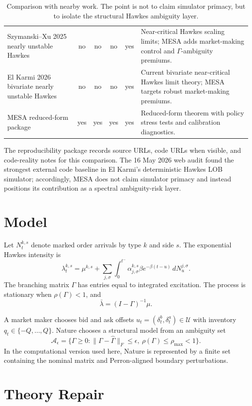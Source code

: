 \documentclass[review]{siamonline250211}
\newcommand{\cA}{\mathcal{A}}
\newcommand{\cU}{\mathcal{U}}
\newcommand{\Gammahat}{\widehat{\Gamma}}
\begin{document}
\begin{table}[htbp]
{\begin{tabular}{@{}>{\raggedright\arraybackslash}p{4.2cm}cccc>{\raggedright\arraybackslash}p{4.6cm}@{}}
Szymanski--Xu 2025 nearly unstable Hawkes & no & no & no & yes & Near-critical Hawkes scaling limits; MESA adds market-making control and $\Gamma$-ambiguity premiums. \\
El Karmi 2026 bivariate nearly unstable Hawkes & no & no & no & yes & Current bivariate near-critical Hawkes limit theory; MESA targets robust market-making premiums. \\
MESA reduced-form package & yes & yes & yes & yes & Reduced-form theorem with policy stress tests and calibration diagnostics. \\
\bottomrule
\end{tabular}}
\caption{Comparison with nearby work. The point is not to claim simulator
primacy, but to isolate the structural Hawkes ambiguity layer.}
\label{tab:sota}
\end{table}

The reproducibility package records source URLs, code URLs when visible, and
code-reality notes for this comparison. The 16 May 2026 web audit found the
strongest external code baseline in El Karmi's deterministic Hawkes LOB
simulator; accordingly, MESA does not claim simulator primacy and instead
positions its contribution as a spectral ambiguity-risk layer.

\section{Model}

Let $N^{k,s}_t$ denote marked order arrivals by type $k$ and side $s$. The
exponential Hawkes intensity is
\[
\lambda^{k,s}_t = \mu^{k,s} +
\sum_{j,\sigma}\int_0^{t^-}
\alpha^{k,s}_{j,\sigma}\beta e^{-\beta(t-u)}\,dN^{j,\sigma}_u.
\]
The branching matrix $\Gamma$ has entries equal to integrated excitation. The
process is stationary when $\rho(\Gamma)<1$, and
\[
\bar\lambda = (I-\Gamma)^{-1}\mu.
\]

A market maker chooses bid and ask offsets
$u_t=(\delta^b_t,\delta^a_t)\in\cU$ with inventory $q_t\in\{-Q,\ldots,Q\}$.
Nature chooses a structural model from an ambiguity set
\[
\cA_\epsilon = \{\Gamma\ge 0:
\|\Gamma-\Gammahat\|_F\le \epsilon,\ \rho(\Gamma)\le \rho_{\max}<1\}.
\]
In the computational version used here, Nature is represented by a finite set
containing the nominal matrix and Perron-aligned boundary perturbations.

\section{Theory Repair}
\end{document}
